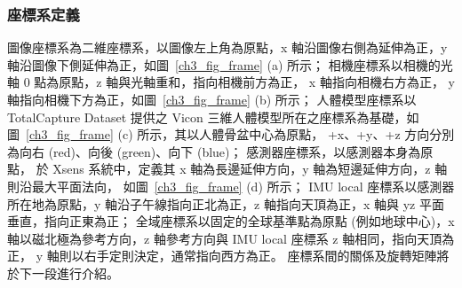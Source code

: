 \subsubsection{座標系定義}
圖像座標系為二維座標系，以圖像左上角為原點，x 軸沿圖像右側為延伸為正，y 軸沿圖像下側延伸為正，如圖~\ref{ch3_fig_frame} (a) 所示；
相機座標系以相機的光軸 0 點為原點，z 軸與光軸重和，指向相機前方為正， x 軸指向相機右方為正， y 軸指向相機下方為正，如圖~\ref{ch3_fig_frame} (b) 所示；
人體模型座標系以 TotalCapture Dataset 提供之 Vicon 三維人體模型所在之座標系為基礎，如圖~\ref{ch3_fig_frame} (c) 所示，其以人體骨盆中心為原點， +x、+y、+z 方向分別為向右 (red)、向後 (green)、向下 (blue)；
感測器座標系，以感測器本身為原點，
於 Xsens 系統中，定義其 x 軸為長邊延伸方向，y 軸為短邊延伸方向，z 軸則沿最大平面法向，
如圖~\ref{ch3_fig_frame} (d) 所示；
IMU local 座標系以感測器所在地為原點，y 軸沿子午線指向正北為正，z 軸指向天頂為正，x 軸與 yz 平面垂直，指向正東為正；
全域座標系以固定的全球基準點為原點 (例如地球中心)，x 軸以磁北極為參考方向，z 軸參考方向與 IMU local 座標系 z 軸相同，指向天頂為正，
y 軸則以右手定則決定，通常指向西方為正。
座標系間的關係及旋轉矩陣將於下一段進行介紹。

